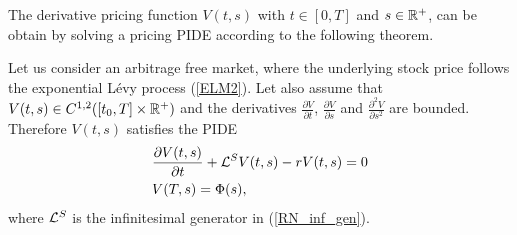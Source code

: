 The derivative pricing function $V(t,s)$ with $t \in [0,T]$ and $s\in \mathbb{R}^+$, can be obtain by solving a pricing PIDE according to the following theorem.
\begin{Theorem}\label{Theorem_PIDE}
 Let us consider an arbitrage free market, where the underlying stock price follows the exponential Lévy process (\ref{ELM2}). 
 Let also assume that $V(t,s) \in C^{1,2}([t_0,T] \times \mathbb{R}^+)$ and the derivatives   %
 $\frac{\partial V}{\partial t}$, $\frac{\partial V}{\partial s}$ %
 and $\frac{\partial^2 V}{\partial s^2}$ are bounded.
 Therefore $V(t,s)$ satisfies the PIDE
\begin{align}\label{derivative_PIDE}
 & \frac{\partial V(t,s)}{\partial t} + \mathcal{L}^{S} V(t,s) -r V(t,s) = 0 \\
 & V(T,s) = \Phi(s),
\end{align}
where $\mathcal{L}^S$ is the infinitesimal generator in (\ref{RN_inf_gen}). 
\end{Theorem}
